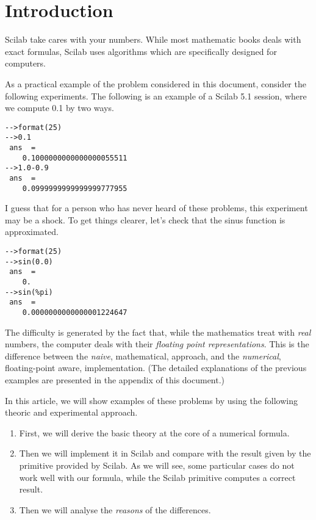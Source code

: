 \section{Introduction}

Scilab take cares with your numbers.
While most mathematic books deals with exact formulas, 
Scilab uses algorithms which are specifically designed for 
computers. 

As a practical example of the problem considered in this
document, consider the following experiments. The following is an example of 
a Scilab 5.1 session, where we compute 0.1 by two ways.

\begin{verbatim}
-->format(25)
-->0.1
 ans  =
    0.1000000000000000055511  
-->1.0-0.9
 ans  =
    0.0999999999999999777955  
\end{verbatim}

I guess that for a person who has never heard of these problems,
this experiment may be a shock. To get things clearer, let's 
check that the sinus function is approximated.

\begin{verbatim}
-->format(25)
-->sin(0.0)
 ans  =
    0.  
-->sin(%pi)
 ans  =
    0.0000000000000001224647  
\end{verbatim}

The difficulty is generated by the fact that, while 
the mathematics treat with \emph{real} numbers, the 
computer deals with their \emph{floating point representations}.
This is the difference between the 
\emph{naive}, mathematical, approach, and the \emph{numerical},
floating-point aware, implementation.
(The detailed explanations of the previous examples are presented  
in the appendix of this document.)

In this article, we will show examples of these problems by 
using the following theoric and experimental approach.
\begin{enumerate}
\item First, we will derive the basic theory at the core of a numerical
formula. 
\item Then we will implement it in Scilab and compare with the 
result given by the primitive provided by Scilab.
As we will see, some particular cases do not work well
with our formula, while the Scilab primitive computes a correct
result.
\item Then we will analyse the \emph{reasons} of the differences.
\end{enumerate}

